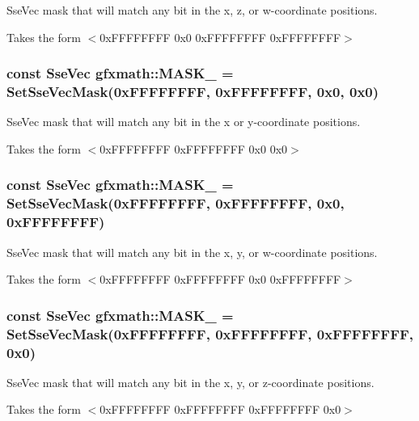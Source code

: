 Sse\+Vec mask that will match any bit in the x, z, or w-\/coordinate positions. 

Takes the form $<$0x\+F\+F\+F\+F\+F\+F\+F\+F 0x0 0x\+F\+F\+F\+F\+F\+F\+F\+F 0x\+F\+F\+F\+F\+F\+F\+F\+F$>$ \hypertarget{namespacegfxmath_aa0a06e585eb58938ab3952d53c917737}{}
\subsubsection[{M\+A\+S\+K\+\_\+1100}]{\setlength{\rightskip}{0pt plus 5cm}const {\bf Sse\+Vec} gfxmath\+::\+M\+A\+S\+K\+\_ = {\bf Set\+Sse\+Vec\+Mask}(0x\+F\+F\+F\+F\+F\+F\+F\+F, 0x\+F\+F\+F\+F\+F\+F\+F\+F, 0x0, 0x0)}\label{namespacegfxmath_aa0a06e585eb58938ab3952d53c917737}


Sse\+Vec mask that will match any bit in the x or y-\/coordinate positions. 

Takes the form $<$0x\+F\+F\+F\+F\+F\+F\+F\+F 0x\+F\+F\+F\+F\+F\+F\+F\+F 0x0 0x0$>$ \hypertarget{namespacegfxmath_a4116006bc68366e5d806a971fe6a3706}{}
\subsubsection[{M\+A\+S\+K\+\_\+1101}]{\setlength{\rightskip}{0pt plus 5cm}const {\bf Sse\+Vec} gfxmath\+::\+M\+A\+S\+K\+\_ = {\bf Set\+Sse\+Vec\+Mask}(0x\+F\+F\+F\+F\+F\+F\+F\+F, 0x\+F\+F\+F\+F\+F\+F\+F\+F, 0x0, 0x\+F\+F\+F\+F\+F\+F\+F\+F)}\label{namespacegfxmath_a4116006bc68366e5d806a971fe6a3706}


Sse\+Vec mask that will match any bit in the x, y, or w-\/coordinate positions. 

Takes the form $<$0x\+F\+F\+F\+F\+F\+F\+F\+F 0x\+F\+F\+F\+F\+F\+F\+F\+F 0x0 0x\+F\+F\+F\+F\+F\+F\+F\+F$>$ \hypertarget{namespacegfxmath_a9aed12c2814b84ca35d5d256596bf68e}{}
\subsubsection[{M\+A\+S\+K\+\_\+1110}]{\setlength{\rightskip}{0pt plus 5cm}const {\bf Sse\+Vec} gfxmath\+::\+M\+A\+S\+K\+\_ = {\bf Set\+Sse\+Vec\+Mask}(0x\+F\+F\+F\+F\+F\+F\+F\+F, 0x\+F\+F\+F\+F\+F\+F\+F\+F, 0x\+F\+F\+F\+F\+F\+F\+F\+F, 0x0)}\label{namespacegfxmath_a9aed12c2814b84ca35d5d256596bf68e}


Sse\+Vec mask that will match any bit in the x, y, or z-\/coordinate positions. 

Takes the form $<$0x\+F\+F\+F\+F\+F\+F\+F\+F 0x\+F\+F\+F\+F\+F\+F\+F\+F 0x\+F\+F\+F\+F\+F\+F\+F\+F 0x0$>$ 